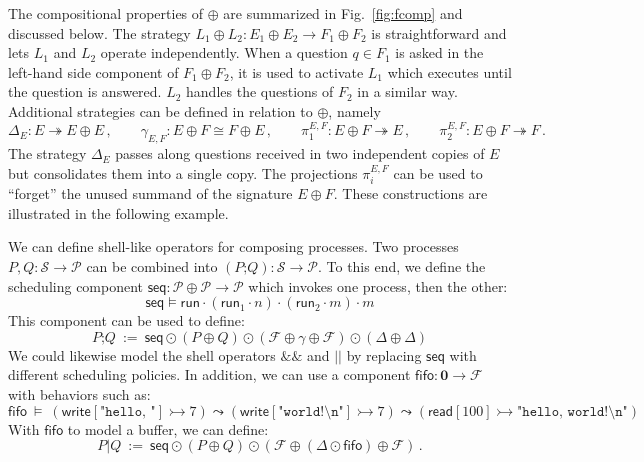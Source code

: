 \documentclass[acmsmall,screen,review,anonymous,nonacm]{acmart}
\newcommand{\kw}[1]{\ensuremath{ \mathsf{#1} }}
\newcommand{\emptysig}{\mathbf0}
\begin{document}
The compositional properties of $\oplus$
are summarized in Fig.~\ref{fig:fcomp} and discussed below.
The strategy
$L_1 \oplus L_2 : E_1 \oplus E_2 \rightarrow F_1 \oplus F_2$
is straightforward and lets $L_1$ and $L_2$ operate independently.
When a question $q \in F_1$ is asked
in the left-hand side component of $F_1 \oplus F_2$,
it is used to activate $L_1$ which executes
until the question is answered.
$L_2$ handles the questions of $F_2$ in a similar way.
Additional strategies
can be defined in relation to $\oplus$, namely
\[
  \Delta_E : E \twoheadrightarrow E \oplus E \,,
  \qquad
  \gamma_{E,F} : E \oplus F \cong F \oplus E \,,
  \qquad
  \pi_1^{E,F} : E \oplus F \twoheadrightarrow E \,,
  \qquad
  \pi_2^{E,F} : E \oplus F \twoheadrightarrow F \,.
\]
The strategy $\Delta_E$ passes along
questions received in two independent copies of $E$
but consolidates them into a single copy.
The projections $\pi_i^{E,F}$
can be used to ``forget'' the unused summand
of the signature $E \oplus F$.
These constructions are illustrated
in the following example.

\begin{example}\label{ex:compse-proc} %
We can define shell-like operators for composing processes.
Two processes $P, Q : \mathcal{S} \rightarrow \mathcal{P}$
can be combined into
$(P \mathbin\texttt{;} Q) : \mathcal{S} \rightarrow \mathcal{P}$.
To this end,
we define the scheduling component
$\kw{seq} : \mathcal{P} \oplus \mathcal{P} \rightarrow \mathcal{P}$
which invokes one process, then the other:
\[
  \kw{seq} \vDash
    \kw{run} \cdot (\kw{run}_1 \cdot n) \cdot (\kw{run}_2 \cdot m) \cdot m
\]
This component can be used to define:
\[
  P \mathbin\texttt{;} Q \: := \:
    \kw{seq} \odot (P \oplus Q)
             \odot (\mathcal{F} \oplus \gamma \oplus \mathcal{F})
             \odot (\Delta \oplus \Delta)
\]
We could likewise model the shell operators $\texttt{\&\&}$ and $\texttt{||}$
by replacing $\kw{seq}$ with different scheduling policies.
In addition,
we can use a component
$\kw{fifo} : \emptysig \rightarrow \mathcal{F}$
with behaviors such as:
{\small
\[
  \kw{fifo} \: \vDash \:
    (\kw{write}[\texttt{"hello, "}] \rightarrowtail 7) \leadsto
    (\kw{write}[\texttt{"world!\textbackslash{}n"}] \rightarrowtail 7) \leadsto
    (\kw{read}[100] \rightarrowtail \texttt{"hello, world!\textbackslash{}n"})
\]
}%
With $\kw{fifo}$ to model a buffer,
we can define:
\[
  P \mathbin\texttt{|} Q \: := \:
    \kw{seq} \odot (P \oplus Q)
         \odot (\mathcal{F} \oplus (\Delta \odot \kw{fifo}) \oplus \mathcal{F})
  \,.
\]
\end{example}
\end{document}
